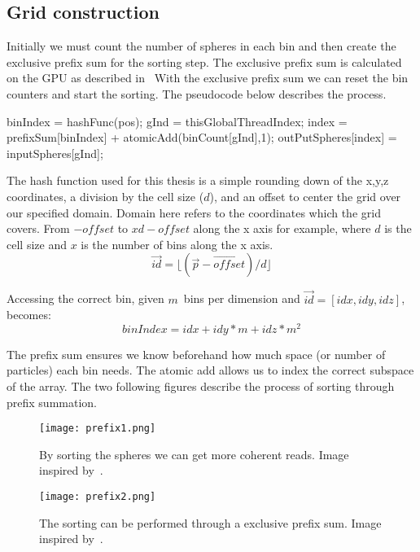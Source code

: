 \subsection{Grid construction}
Initially we must count
the number of spheres in each bin and then create the exclusive prefix sum for the sorting
step. The exclusive prefix sum is calculated on the GPU as described in~\cite{gpugems}
With the exclusive prefix sum we can reset the bin counters and start the sorting.
The pseudocode below describes
the process.

\begin{algorithm}[H]
  \begin{algorithmic}[1]
  \State binIndex = hashFunc(pos);
  \State gInd = thisGlobalThreadIndex;
  \State index = prefixSum[binIndex] + atomicAdd(binCount[gInd],1);
  \State outPutSpheres[index] = inputSpheres[gInd];
\end{algorithmic}
\end{algorithm}

The hash function used for this thesis is a simple rounding down of the x,y,z coordinates, a
division by the cell size ($d$), and an offset to center the grid over our specified domain.
Domain here refers to the coordinates which the grid covers. From $-offset$ to $xd-offset$ along the
x axis for example, where $d$ is the cell size and $x$ is the number of bins along the x axis.
\begin{equation}
  \vec{id} = \lfloor(\vec{p}-\vec{offset})/d\rfloor
\end{equation}

Accessing the correct bin, given $m$ bins per dimension and $\vec{id} = [idx,idy,idz]$, becomes:
\begin{equation}
  binIndex = idx + idy*m + idz*m^2
\end{equation}

The prefix sum ensures we know beforehand how much space (or number of particles)
each bin needs. The atomic add allows us to index the correct subspace of the
array. The two following figures describe the process of sorting through prefix summation.

\begin{figure}[H]
  \centering
  \texttt{[image: prefix1.png]}
  \caption{By sorting the spheres we can get more coherent reads. Image inspired by~\cite{fastnearest}.}
\end{figure}

\begin{figure}[H]
  \centering
  \texttt{[image: prefix2.png]}
  \caption{The sorting can be performed through a exclusive prefix sum. Image inspired by~\cite{fastnearest}.}
\end{figure}

